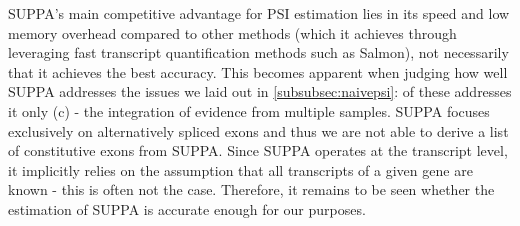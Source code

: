 SUPPA's main competitive advantage for PSI estimation lies in its speed and low memory overhead compared to other methods \cite{suppa} (which it achieves through leveraging fast transcript quantification methods such as Salmon), not necessarily that it achieves the best accuracy. This becomes apparent when judging how well SUPPA addresses the issues we laid out in \ref{subsubsec:naivepsi}: of these addresses it only (c) - the integration of evidence from multiple samples. SUPPA focuses exclusively on alternatively spliced exons and thus we are not able to derive a list of constitutive exons from SUPPA. Since SUPPA operates at the transcript level, it implicitly relies on the assumption that all transcripts of a given gene are known - this is often not the case. Therefore, it remains to be seen whether the estimation of SUPPA is accurate enough for our purposes.





